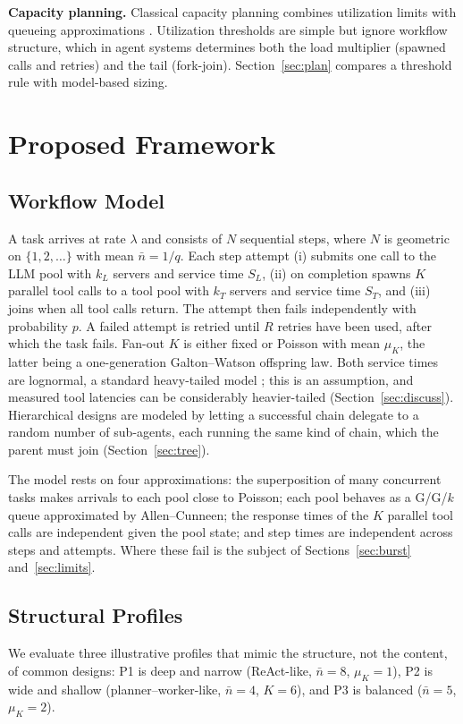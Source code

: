 \documentclass[journal]{IEEEtran}
\begin{document}
\textbf{Capacity planning.} Classical capacity planning combines utilization limits with queueing approximations \cite{lazowska1984quantitative,bolch2006queueing}. Utilization thresholds are simple but ignore workflow structure, which in agent systems determines both the load multiplier (spawned calls and retries) and the tail (fork-join). Section~\ref{sec:plan} compares a threshold rule with model-based sizing.


\section{Proposed Framework}\label{sec:method}
\subsection{Workflow Model}
A task arrives at rate $\lambda$ and consists of $N$ sequential steps, where $N$ is geometric on $\{1,2,\dots\}$ with mean $\bar n=1/q$. Each step attempt (i) submits one call to the LLM pool with $k_L$ servers and service time $S_L$, (ii) on completion spawns $K$ parallel tool calls to a tool pool with $k_T$ servers and service time $S_T$, and (iii) joins when all tool calls return. The attempt then fails independently with probability $p$. A failed attempt is retried until $R$ retries have been used, after which the task fails. Fan-out $K$ is either fixed or Poisson with mean $\mu_K$, the latter being a one-generation Galton--Watson offspring law. Both service times are lognormal, a standard heavy-tailed model \cite{mitzenmacher2004lognormal}; this is an assumption, and measured tool latencies can be considerably heavier-tailed (Section~\ref{sec:discuss}). Hierarchical designs are modeled by letting a successful chain delegate to a random number of sub-agents, each running the same kind of chain, which the parent must join (Section~\ref{sec:tree}).

The model rests on four approximations: the superposition of many concurrent tasks makes arrivals to each pool close to Poisson; each pool behaves as a G/G/$k$ queue approximated by Allen--Cunneen; the response times of the $K$ parallel tool calls are independent given the pool state; and step times are independent across steps and attempts. Where these fail is the subject of Sections~\ref{sec:burst} and~\ref{sec:limits}.

\subsection{Structural Profiles}
We evaluate three illustrative profiles that mimic the structure, not the content, of common designs: P1 is deep and narrow (ReAct-like, $\bar n{=}8$, $\mu_K{=}1$), P2 is wide and shallow (planner--worker-like, $\bar n{=}4$, $K{=}6$), and P3 is balanced ($\bar n{=}5$, $\mu_K{=}2$).
\end{document}
